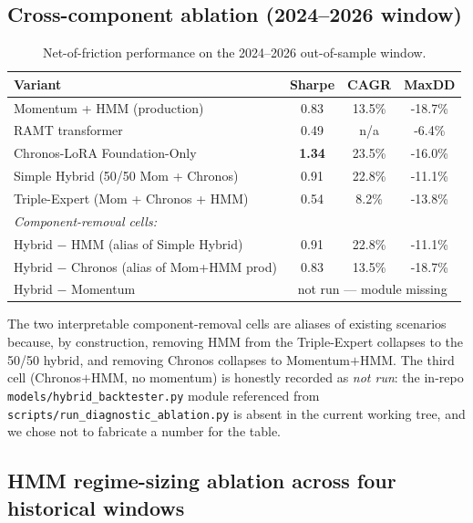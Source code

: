 \documentclass[conference]{IEEEtran}
\begin{document}
\subsection{Cross-component ablation (2024--2026 window)}
\begin{table}[ht]
\centering
\caption{Net-of-friction performance on the 2024--2026 out-of-sample window.}
\label{tab:ablation}
\begin{tabular}{lccc}
\toprule
\textbf{Variant} & \textbf{Sharpe} & \textbf{CAGR} & \textbf{MaxDD} \\
\midrule
Momentum + HMM (production)            & 0.83 & 13.5\% & -18.7\% \\
RAMT transformer                       & 0.49 & n/a    & -6.4\%  \\
Chronos-LoRA Foundation-Only           & \textbf{1.34} & 23.5\% & -16.0\% \\
Simple Hybrid (50/50 Mom + Chronos)    & 0.91 & 22.8\% & -11.1\% \\
Triple-Expert (Mom + Chronos + HMM)    & 0.54 & 8.2\%  & -13.8\% \\
\midrule
\multicolumn{4}{l}{\emph{Component-removal cells:}} \\
Hybrid $-$ HMM (alias of Simple Hybrid)    & 0.91 & 22.8\% & -11.1\% \\
Hybrid $-$ Chronos (alias of Mom+HMM prod) & 0.83 & 13.5\% & -18.7\% \\
Hybrid $-$ Momentum                        & \multicolumn{3}{c}{not run --- module missing} \\
\bottomrule
\end{tabular}
\end{table}

The two interpretable component-removal cells are aliases of existing
scenarios because, by construction, removing HMM from the Triple-Expert
collapses to the 50/50 hybrid, and removing Chronos collapses to
Momentum$+$HMM. The third cell (Chronos$+$HMM, no momentum) is honestly
recorded as \emph{not run}: the in-repo \texttt{models/hybrid\_backtester.py}
module referenced from \texttt{scripts/run\_diagnostic\_ablation.py} is absent
in the current working tree, and we chose not to fabricate a number for the
table.

\subsection{HMM regime-sizing ablation across four historical windows}
\end{document}
